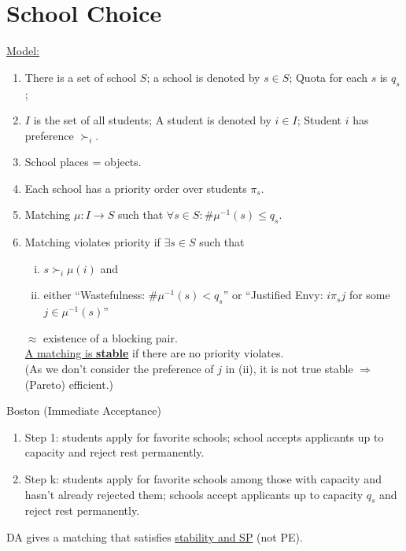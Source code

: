 \documentclass[11pt]{elegantbook}
\begin{document}
\section{School Choice}
\underline{Model:}
\begin{enumerate}
    \item There is a set of school $S$; a school is denoted by $s\in S$; Quota for each $s$ is $q_s$;
    \item $I$ is the set of all students; A student is denoted by $i\in I$; Student $i$ has preference $\succ_i$.
    \item School places = objects.
    \item Each school has a priority order over students $\pi_s$.
    \item Matching $\mu: I \rightarrow S$ such that $\forall s\in S: \# \mu^{-1}(s)\leq q_s$.
    \item Matching violates priority if $\exists s\in S$ such that
    \begin{enumerate}[(i).]
        \item $s\succ_i\mu(i)$ and
        \item either ``Wastefulness: $\# \mu^{-1}(s)< q_s$'' or ``Justified Envy: $i\pi_s j$ for some $j\in \mu^{-1}(s)$''
    \end{enumerate}
    $\approx$ existence of a blocking pair.\\
    \underline{A matching is \textbf{stable}} if there are no priority violates.\\
    (As we don't consider the preference of $j$ in (ii), it is not true stable $\Rightarrow$ (Pareto) efficient.)
\end{enumerate}

\begin{example}
    Boston (Immediate Acceptance)
    \begin{enumerate}[(1).]
        \item Step 1: students apply for favorite schools; school accepts applicants up to capacity and reject rest permanently.
        \item Step k: students apply for favorite schools among those with capacity and hasn't already rejected them; schools accept applicants up to capacity $q_s$ and reject rest permanently.
    \end{enumerate}
\end{example}

\begin{proposition}
DA gives a matching that satisfies \underline{stability and SP} (not PE).
\end{proposition}
\end{document}
